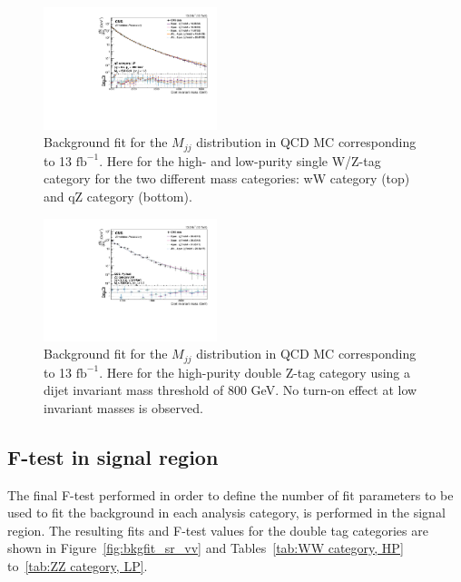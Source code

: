 \begin{figure}[htb]
\includegraphics[width=0.45\textwidth]{figures/analysis/search2/AN-16-235/plots/qZLP_fitComp.pdf}
\caption{Background fit for the $M_{jj}$ distribution in QCD MC corresponding to 13 $\textrm{fb}^{-1}$. Here for the high- and low-purity single W/Z-tag category for the two different mass categories: wW category (top) and qZ category (bottom).}
\label{fig:bkgfitQCD_qV}
\end{figure}

\begin{figure}[htb]
\centering
\includegraphics[width=0.45\textwidth]{figures/analysis/search2/AN-16-235/plots/ZZHP_fitComp_mjj800.pdf}
\caption{Background fit for the $M_{jj}$ distribution in QCD MC corresponding to 13 $\textrm{fb}^{-1}$. Here for the high-purity double Z-tag category using a dijet invariant mass threshold of 800 GeV. No turn-on effect at low invariant masses is observed.}
\label{fig:bkgfitQCD_ZZHP}
\end{figure}


% 

\subsection{F-test in signal region}
\label{sec:app:2016:ftest}

The final F-test performed in order to define the number of fit parameters to be used to fit the background in each analysis category, is performed in the signal region. The resulting fits and F-test values for the double tag categories are shown in
Figure~\ref{fig:bkgfit_sr_vv} and Tables~\ref{tab:WW category, HP} to~\ref{tab:ZZ category, LP}.

